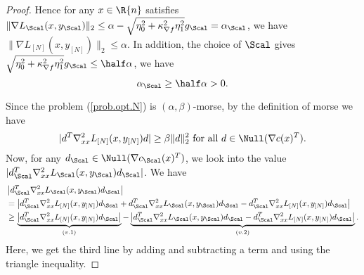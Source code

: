 \begin{proof}
Hence for any $x\in\R{n}$ satisfies $\|\nabla L_\Scal(x,y_\Scal)\|_2\le \alpha-  \sqrt{\eta_0^2+\kappa_{\nabla f}^2\eta_1^2}g_\Scal=\alpha_\Scal$, we have $\|\nabla L_{[N]}(x,y_{[N]})\|_2\le  \alpha$.
In addition, the choice of $\Scal$ gives $\sqrt{\eta_0^2+\kappa_{\nabla f}^2\eta_1^2}g_\Scal\le\half\alpha$, we have
\[
 \alpha_\Scal\ge\half\alpha>0.
\]

Since the problem (\ref{prob.opt.N}) is $(\alpha,\beta)$-morse, by the definition of morse we have 
\[
|d^T\nabla^2_{xx}L_{[N]}(x,y_{[N]} )d|\ge\beta\|d\|_2^2 \text{ for all } d\in\Null(\nabla c(x)^T).
\]
Now, for any $d_\Scal\in\Null(\nabla c_\Scal(x)^T)$, we look into the value $|d_\Scal^T\nabla^2_{xx}L_\Scal(x,y_\Scal)d_\Scal|$. We have
\begin{align*}
&\left|d_\Scal^T\nabla^2_{xx}L_\Scal(x,y_\Scal)d_\Scal\right|\\
	&=\left| d^T_\Scal\nabla^2_{xx}L_{[N]}(x,y_{[N]})d_\Scal+d_\Scal^T\nabla^2_{xx}L_\Scal(x,y_\Scal)d_\Scal-d^T_\Scal\nabla^2_{xx}L_{[N]}(x,y_{[N]})d_\Scal\right|\\
	&\ge \underbrace{\left| d_\Scal^T\nabla^2_{xx}L_{[N]}(x,y_{[N]})d_\Scal\right|}_{(v.1)}-\underbrace{\left|d_\Scal^T\nabla^2_{xx}L_\Scal(x,y_\Scal)d_\Scal-d_\Scal^T\nabla^2_{xx}L_{[N]}(x,y_{[N]})d_\Scal\right|}_{(v.2)}.
\end{align*}
Here, we get the third line by adding and subtracting a term and using the triangle inequality. 


\end{proof}
